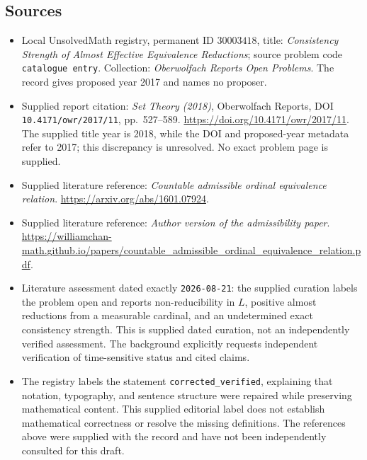 \documentclass[11pt]{article}
\begin{document}
\subsection{Sources}
\begin{itemize}
\item Local UnsolvedMath registry, permanent ID \(30003418\), title: \emph{Consistency Strength of Almost Effective Equivalence Reductions}; source problem code \texttt{catalogue entry}. Collection: \emph{Oberwolfach Reports Open Problems}. The record gives proposed year 2017 and names no proposer.
\item Supplied report citation: \emph{Set Theory (2018)}, Oberwolfach Reports, DOI \texttt{10.4171/owr/2017/11}, pp.~527--589. \url{https://doi.org/10.4171/owr/2017/11}. The supplied title year is 2018, while the DOI and proposed-year metadata refer to 2017; this discrepancy is unresolved. No exact problem page is supplied.
\item Supplied literature reference: \emph{Countable admissible ordinal equivalence relation}. \url{https://arxiv.org/abs/1601.07924}.
\item Supplied literature reference: \emph{Author version of the admissibility paper}. \url{https://williamchan-math.github.io/papers/countable_admissible_ordinal_equivalence_relation.pdf}.
\item Literature assessment dated exactly \texttt{2026-08-21}: the supplied curation labels the problem open and reports non-reducibility in \(L\), positive almost reductions from a measurable cardinal, and an undetermined exact consistency strength. This is supplied dated curation, not an independently verified assessment. The background explicitly requests independent verification of time-sensitive status and cited claims.
\item The registry labels the statement \texttt{corrected\_verified}, explaining that notation, typography, and sentence structure were repaired while preserving mathematical content. This supplied editorial label does not establish mathematical correctness or resolve the missing definitions. The references above were supplied with the record and have not been independently consulted for this draft.
\end{itemize}
\end{document}
